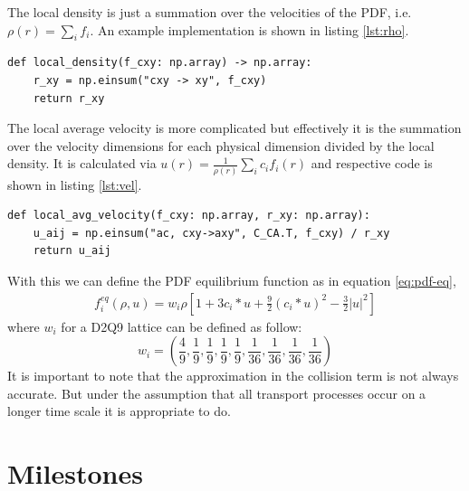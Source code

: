 \documentclass[a4paper,11pt, oneside]{book}
\begin{document}
The local density is just a summation over the velocities of the PDF, i.e. $\rho(r) = \sum_{i} f_{i}$.
An example implementation is shown in listing \ref{lst:rho}.
\begin{center}
\begin{lstlisting}[caption=Implementation of the local density,label=lst:rho, basicstyle=\small]
def local_density(f_cxy: np.array) -> np.array:
    r_xy = np.einsum("cxy -> xy", f_cxy)
    return r_xy
  \end{lstlisting}
\end{center}
The local average velocity is more complicated but effectively it is the summation over the velocity dimensions for each physical dimension divided by the local density.
It is calculated via $u(r)=\frac{1}{\rho (r)} \sum_{i} c_{i}f_{i}(r)$ and respective code is shown in listing \ref{lst:vel}.
\begin{center}
  \begin{lstlisting}[caption=Implementation of the local average velocity.,label=lst:vel, basicstyle=\small]
def local_avg_velocity(f_cxy: np.array, r_xy: np.array):
    u_aij = np.einsum("ac, cxy->axy", C_CA.T, f_cxy) / r_xy
    return u_aij
  \end{lstlisting}
\end{center}
With this we can define the PDF equilibrium function as in equation \ref{eq:pdf-eq},
\begin{equation}
  \label{eq:pdf-eq}
  \begin{aligned}
    f_{i}^{eq} ( \rho , u ) = w_i \rho \left[ 1+3 c_i * u + \frac{9}{2}(c_i * u )^2 - \frac{3}{2} | u |^2 \right]
  \end{aligned}
\end{equation}
where $w_i$ for a D2Q9 lattice can be defined as follow: 
\begin{equation}
w_i = \left( \frac{4}{9}, \frac{1}{9}, \frac{1}{9}, \frac{1}{9}, \frac{1}{9}, \frac{1}{36}, \frac{1}{36}, \frac{1}{36}, \frac{1}{36} \right)
\end{equation}
It is important to note that the approximation in the collision term is not always accurate.
But under the assumption that all transport processes occur on a longer time scale it is appropriate to do.


\chapter{Milestones}
\end{document}
